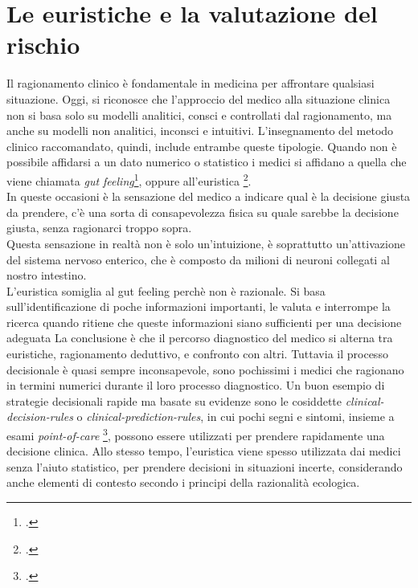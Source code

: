 \section{Le euristiche e la valutazione del rischio}

Il ragionamento clinico è fondamentale in medicina per affrontare qualsiasi situazione. Oggi, si riconosce che l'approccio del medico alla situazione clinica non si basa solo su modelli analitici, consci e controllati dal ragionamento, ma anche su modelli non analitici, inconsci e intuitivi. L'insegnamento del metodo clinico raccomandato, quindi, include entrambe queste tipologie. Quando non è possibile affidarsi a un dato numerico o statistico i medici si affidano a quella che viene chiamata \textit{gut feeling}\footcite{womak:arte-probabilita-coen}, oppure all'euristica \footcite{womak:recenti-progressi-medicina}.\\
In queste occasioni è la sensazione del medico a indicare qual è la decisione giusta da prendere, c'è una sorta di consapevolezza fisica su quale sarebbe la decisione giusta, senza ragionarci troppo sopra.\\
Questa sensazione in realtà non è solo un'intuizione, è soprattutto un'attivazione del sistema nervoso enterico, che è composto da milioni di neuroni collegati al nostro intestino. \\

L'euristica somiglia al gut feeling perchè non è razionale. Si basa sull'identificazione di poche informazioni importanti, le valuta e interrompe la ricerca quando ritiene che queste informazioni siano sufficienti per una decisione adeguata 
La conclusione è che il percorso diagnostico del medico si alterna tra euristiche, ragionamento deduttivo, e confronto con altri. Tuttavia il processo decisionale è quasi sempre inconsapevole, sono pochissimi i medici che ragionano in termini numerici durante il loro processo diagnostico.
Un buon esempio di strategie decisionali rapide ma basate su evidenze sono le cosiddette \textit{\gls{clinical-decision-rules}} o \textit{\gls{clinical-prediction-rules}}, in cui pochi segni e sintomi, insieme a esami \textit{\gls{point-of-care}} \footcite{womak:recenti-progressi-medicina}, possono essere utilizzati per prendere rapidamente una decisione clinica. Allo stesso tempo, l'euristica viene spesso utilizzata dai medici senza l'aiuto statistico, per prendere decisioni in situazioni incerte, considerando anche elementi di contesto secondo i principi della razionalità ecologica.\\

